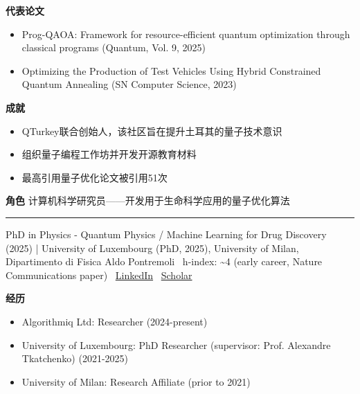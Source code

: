 \par{\footnotesize\color{mainred}\textbf{代表论文}}
\begin{itemize}[leftmargin=1.2em,itemsep=0pt,topsep=0pt]
\item {\footnotesize Prog-QAOA: Framework for resource-efficient quantum optimization through classical programs (Quantum, Vol. 9, 2025)}
\item {\footnotesize Optimizing the Production of Test Vehicles Using Hybrid Constrained Quantum Annealing (SN Computer Science, 2023)}
\end{itemize}
\par{\footnotesize\color{mainred}\textbf{成就}}
\begin{itemize}[leftmargin=1.2em,itemsep=0pt,topsep=0pt]
\item {\footnotesize QTurkey联合创始人，该社区旨在提升土耳其的量子技术意识}
\item {\footnotesize 组织量子编程工作坊并开发开源教育材料}
\item {\footnotesize 最高引用量子优化论文被引用51次}
\end{itemize}
\par{\footnotesize\color{mainred}\textbf{角色}} {\footnotesize 计算机科学研究员——开发用于生命科学应用的量子优化算法}
\vspace{2pt}\hrule\vspace{2pt}
\vspace{4pt}
\par{\footnotesize\color{graytext}PhD in Physics - Quantum Physics / Machine Learning for Drug Discovery (2025) | University of Luxembourg (PhD, 2025), University of Milan, Dipartimento di Fisica Aldo Pontremoli \textbar\  h-index: \textasciitilde{}4 (early career, Nature Communications paper) \textbar\  \href{https://www.linkedin.com/in/alessiofallani/}{LinkedIn} \textbar\  \href{https://orbilu.uni.lu/profile?uid=50045086}{Scholar}}
\par{\footnotesize\color{mainred}\textbf{经历}}
\begin{itemize}[leftmargin=1.2em,itemsep=0pt,topsep=0pt]
\item {\footnotesize Algorithmiq Ltd: Researcher (2024-present)}
\item {\footnotesize University of Luxembourg: PhD Researcher (supervisor: Prof. Alexandre Tkatchenko) (2021-2025)}
\item {\footnotesize University of Milan: Research Affiliate (prior to 2021)}
\end{itemize}
